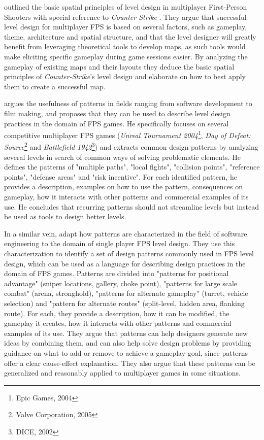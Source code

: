  outlined the basic spatial principles of level design in multiplayer First-Person Shooters with special reference to \textit{Counter-Strike} \cite{guttler_spatial_2003}. They argue  that successful level design for multiplayer FPS is based on several factors, such as gameplay, theme, architecture and spatial structure, and that the level designer will greatly benefit from leveraging theoretical tools to develop maps, as such tools would make  eliciting specific gameplay during game sessions easier. By analyzing the gameplay of existing maps and their layouts they deduce the basic spatial principles of \textit{Counter-Strike}'s level design and elaborate on how to best apply them to create a successful map. 

 argues the usefulness of patterns in fields ranging from software development to film making, and proposes that they can be used to describe level design practices in the domain of FPS games. He specifically focuses on several competitive multiplayer FPS games (\textit{Unreal Tournament 2004}\footnote{Epic Games, 2004}, \textit{Day of Defeat: Source}\footnote{Valve Corporation, 2005} and \textit{Battlefield 1942}\footnote{DICE, 2002}) and extracts common design patterns by analyzing several levels in search of common ways of solving problematic elements. He defines the patterns of "multiple paths", "local fights", "collision points", "reference points", "defense areas" and "risk incentive". For each identified pattern, he provides a description, examples on how to use the pattern, consequences on gameplay, how it interacts with other patterns and commercial examples of its use. He concludes that recurring patterns should not streamline levels but instead be used as tools to design better levels. \cite{larsen_level_2006}

In a similar vein,  adapt how patterns are characterized in the field of software engineering to the domain of single player FPS level design. They use this characterization to identify a set of design patterns commonly used in FPS level design, which can be used as a language for describing design practices in the domain of FPS games. Patterns are divided into "patterns for positional advantage" (sniper locations, gallery, choke point), "patterns for large scale combat" (arena, stronghold), "patterns for alternate gameplay" (turret, vehicle selection) and "pattern for alternate routes" (split-level, hidden area, flanking route). For each, they provide a description, how it can be modified, the gameplay it creates, how it interacts with other patterns and commercial examples of its use. 
They argue that patterns can help designers generate new ideas by combining them, and can also help solve design problems by providing guidance on what to add or remove to achieve a gameplay goal, since patterns offer a clear cause-effect explanation. They also argue that these patterns can be generalized and reasonably applied to multiplayer games in some situations. \cite{hullett_design_2010}


